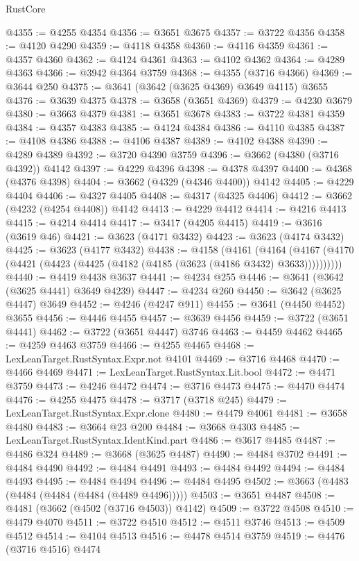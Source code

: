 \begin{lexlean}{RustCore}
\begin{coremodule}
@4355 := @4255 @4354
@4356 := @3651 @3675
@4357 := @3722 @4356
@4358 := @4120 @4290
@4359 := @4118 @4358
@4360 := @4116 @4359
@4361 := @4357 @4360
@4362 := @4124 @4361
@4363 := @4102 @4362
@4364 := @4289 @4363
@4366 := @3942 @4364 @3759
@4368 := @4355 (@3716 @4366)
@4369 := @3644 @250
@4375 := @3641 (@3642 (@3625 @4369) @3649 @4115) @3655
@4376 := @3639 @4375
@4378 := @3658 (@3651 @4369)
@4379 := @4230 @3679
@4380 := @3663 @4379
@4381 := @3651 @3678
@4383 := @3722 @4381 @4359
@4384 := @4357 @4383
@4385 := @4124 @4384
@4386 := @4110 @4385
@4387 := @4108 @4386
@4388 := @4106 @4387
@4389 := @4102 @4388
@4390 := @4289 @4389
@4392 := @3720 @4390 @3759
@4396 := @3662 (@4380 (@3716 @4392)) @4142
@4397 := @4229 @4396
@4398 := @4378 @4397
@4400 := @4368 (@4376 @4398)
@4404 := @3662 (@4329 (@4346 @4400)) @4142
@4405 := @4229 @4404
@4406 := @4327 @4405
@4408 := @4317 (@4325 @4406)
@4412 := @3662 (@4232 (@4254 @4408)) @4142
@4413 := @4229 @4412
@4414 := @4216 @4413
@4415 := @4214 @4414
@4417 := @3417 (@4205 @4415)
@4419 := @3616 (@3619 @46)
@4421 := @3623 (@4171 @3432)
@4423 := @3623 (@4174 @3432)
@4425 := @3623 (@4177 @3432)
@4438 := @4158
    (@4161
      (@4164 (@4167 (@4170 (@4421 (@4423 (@4425 (@4182 (@4185 (@3623 (@4186 @3432) @3633))))))))))
@4440 := @4419 @4438 @3637
@4441 := @4234 @255
@4446 := @3641 (@3642 (@3625 @4441) @3649 @4239)
@4447 := @4234 @260
@4450 := @3642 (@3625 @4447) @3649
@4452 := @4246 (@4247 @911)
@4455 := @3641 (@4450 @4452) @3655
@4456 := @4446 @4455
@4457 := @3639 @4456
@4459 := @3722 (@3651 @4441)
@4462 := @3722 (@3651 @4447) @3746
@4463 := @4459 @4462
@4465 := @4259 @4463 @3759
@4466 := @4255 @4465
@4468 := LexLeanTarget.RustSyntax.Expr.not @4101
@4469 := @3716 @4468
@4470 := @4466 @4469
@4471 := LexLeanTarget.RustSyntax.Lit.bool
@4472 := @4471 @3759
@4473 := @4246 @4472
@4474 := @3716 @4473
@4475 := @4470 @4474
@4476 := @4255 @4475
@4478 := @3717 (@3718 @245)
@4479 := LexLeanTarget.RustSyntax.Expr.clone
@4480 := @4479 @4061
@4481 := @3658 @4480
@4483 := @3664 @23 @200
@4484 := @3668 @4303
@4485 := LexLeanTarget.RustSyntax.IdentKind.part
@4486 := @3617 @4485
@4487 := @4486 @324
@4489 := @3668 (@3625 @4487)
@4490 := @4484 @3702
@4491 := @4484 @4490
@4492 := @4484 @4491
@4493 := @4484 @4492
@4494 := @4484 @4493
@4495 := @4484 @4494
@4496 := @4484 @4495
@4502 := @3663 (@4483 (@4484 (@4484 (@4484 (@4489 @4496)))))
@4503 := @3651 @4487
@4508 := @4481 (@3662 (@4502 (@3716 @4503)) @4142)
@4509 := @3722 @4508
@4510 := @4479 @4070
@4511 := @3722 @4510
@4512 := @4511 @3746
@4513 := @4509 @4512
@4514 := @4104 @4513
@4516 := @4478 @4514 @3759
@4519 := @4476 (@3716 @4516) @4474

\end{coremodule}
\end{lexlean}
